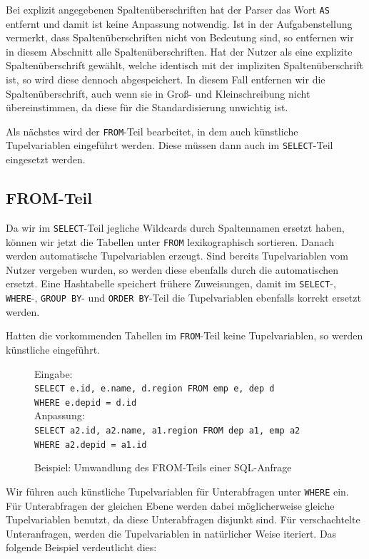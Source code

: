 Bei explizit angegebenen Spaltenüberschriften hat der Parser das Wort \verb|AS| entfernt und damit ist keine Anpassung notwendig. Ist in der Aufgabenstellung vermerkt, dass Spaltenüberschriften nicht von Bedeutung sind, so entfernen wir in diesem Abschnitt alle Spaltenüberschriften. Hat der Nutzer als eine explizite Spaltenüberschrift gewählt, welche identisch mit der impliziten Spaltenüberschrift ist, so wird diese dennoch abgespeichert. In diesem Fall entfernen wir die Spaltenüberschrift, auch wenn sie in Groß- und Kleinschreibung nicht übereinstimmen, da diese für die Standardisierung unwichtig ist.

Als nächstes wird der \verb|FROM|-Teil bearbeitet, in dem auch künstliche Tupelvariablen eingeführt werden. Diese müssen dann auch im \verb|SELECT|-Teil eingesetzt werden.

\subsection{FROM-Teil}
\label{subsec:from}

Da wir im \verb|SELECT|-Teil jegliche Wildcards durch Spaltennamen ersetzt haben, können wir jetzt die Tabellen unter \verb|FROM| lexikographisch sortieren. Danach werden automatische Tupelvariablen erzeugt. Sind bereits Tupelvariablen vom Nutzer vergeben wurden, so werden diese ebenfalls durch die automatischen ersetzt. Eine Hashtabelle speichert frühere Zuweisungen, damit im \verb|SELECT|-, \verb|WHERE|-, \verb|GROUP BY|- und \verb|ORDER BY|-Teil die Tupelvariablen ebenfalls korrekt ersetzt werden.

Hatten die vorkommenden Tabellen im \verb|FROM|-Teil keine Tupelvariablen, so werden künstliche eingeführt.

\begin{figure}[H]
Eingabe: \\\verb|SELECT e.id, e.name, d.region FROM emp e, dep d|\\\verb|WHERE e.depid = d.id|\\

Anpassung: \\\verb|SELECT a2.id, a2.name, a1.region FROM dep a1, emp a2|\\\verb|WHERE a2.depid = a1.id|\\
\caption{Beispiel: Umwandlung des FROM-Teils einer SQL-Anfrage}
\end{figure}

Wir führen auch künstliche Tupelvariablen für Unterabfragen unter \verb|WHERE| ein. Für Unterabfragen der gleichen Ebene werden dabei möglicherweise gleiche Tupelvariablen benutzt, da diese Unterabfragen disjunkt sind. Für verschachtelte Unteranfragen, werden die Tupelvariablen in natürlicher Weise iteriert. Das folgende Beispiel verdeutlicht dies:

